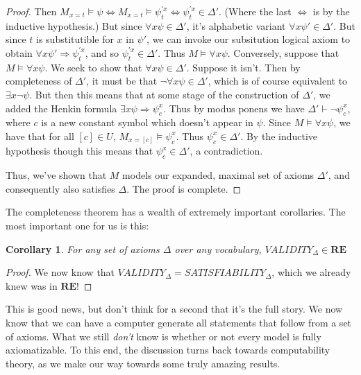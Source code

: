 \documentclass{article}
\theoremstyle{definition}
\theoremstyle{plain}
\theoremstyle{theorem}
\newtheorem{corollary}{Corollary}[section]
\begin{document}
\begin{proof}
    Then $M_{x = t} \models \psi \iff M_{x = t} \models \psi_t^{'x} \iff \psi_t^{'x} \in \Delta'$. (Where the last $\iff$ is by the inductive hypothesis.) 
    But since $\forall x \psi \in \Delta'$, it's alphabetic variant $\forall x \psi' \in \Delta'$. But since $t$ is substitutible for $x$ in $\psi'$, we can invoke our subsitution logical axiom to obtain $\forall x \psi' \Rightarrow \psi_t^{'x}$, and so $\psi_t^{'x} \in \Delta'$. Thus $M \models \forall x \psi$. 
    Conversely, suppose that $M \models \forall x \psi$. We seek to show that $\forall x \psi \in \Delta'$. Suppose it isn't. Then by completeness of $\Delta'$, it must be that $\neg \forall x \psi \in \Delta'$, which is of course equivalent to $\exists x \neg \psi$. But then this means that at some stage of the construction of $\Delta'$, we added the Henkin formula $\exists x \psi \Rightarrow \psi_c^x$. Thus by modus ponens we have $\Delta' \vdash \neg \psi_c^x$, where $c$ is a new constant symbol which doesn't appear in $\psi$. Since $M \models \forall x \psi$, we have that for all $[c] \in U$, $M_{x = [c]} \models \psi_c^x$. Thus $\psi_c^x \in \Delta'$. By the inductive hypothesis though this means that $\psi_c^x \in \Delta'$, a contradiction.  
    \par Thus, we've shown that $M$ models our expanded, maximal set of axioms $\Delta'$, and consequently also satisfies $\Delta$. The proof is complete.
\end{proof}
The completeness theorem has a wealth of extremely important corollaries. The most important one for us is this:
\begin{corollary}
    For any set of axioms $\Delta$ over any vocabulary, $VALIDITY_{\Delta} \in \textbf{RE}$ 
\end{corollary}
\begin{proof}
    We now know that $VALIDITY_{\Delta} = SATISFIABILITY_{\Delta}$, which we already knew was in $\textbf{RE}$!
\end{proof}
This is good news, but don't think for a second that it's the full story. We now know that we can have a computer generate all statements that follow from a set of axioms. What we still \textit{don't} know is whether or not every model is fully axiomatizable. To this end, the discussion turns back towards computability theory, as we make our way towards some truly amazing results. 
\end{document}
